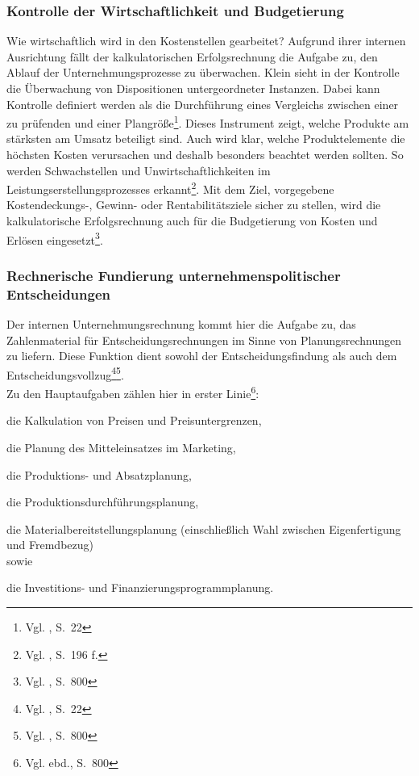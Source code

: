 \subsubsection{Kontrolle der Wirtschaftlichkeit und Budgetierung}
Wie wirtschaftlich wird in den Kostenstellen gearbeitet?
Aufgrund ihrer internen Ausrichtung fällt der kalkulatorischen Erfolgsrechnung die Aufgabe zu, den Ablauf der Unternehmungsprozesse zu überwachen. Klein sieht in der Kontrolle die Überwachung von Dispositionen untergeordneter Instanzen. Dabei kann Kontrolle definiert werden als die \glqq Durchführung eines Vergleichs zwischen einer zu prüfenden und einer Plangröße\grqq \footnote{Vgl. \cite{Klein1999}, S.~22}.
Dieses Instrument zeigt, welche Produkte am stärksten am Umsatz beteiligt sind. Auch wird klar, welche Produktelemente die höchsten Kosten verursachen und deshalb besonders beachtet werden sollten. So werden Schwachstellen und Unwirtschaftlichkeiten im Leistungserstellungsprozesses erkannt\footnote{Vgl. \cite{Woltje2008}, S.~196 f.}. Mit dem Ziel, vorgegebene Kostendeckungs-, Gewinn- oder Rentabilitätsziele sicher zu stellen, wird die kalkulatorische Erfolgsrechnung auch für die Budgetierung von Kosten und Erlösen eingesetzt\footnote{Vgl. \cite{Schierenbeck2008}, S.~800}.

\subsubsection{Rechnerische Fundierung unternehmenspolitischer Entscheidungen}
Der internen Unternehmungsrechnung kommt hier die Aufgabe zu, das Zahlenmaterial für Entscheidungsrechnungen im Sinne von Planungsrechnungen zu liefern. Diese Funktion dient sowohl der Entscheidungsfindung als auch dem Entscheidungsvollzug\footnote{Vgl. \cite{Klein1999}, S.~22}\footnote{Vgl. \cite{Schierenbeck2008}, S.~800}.\\
Zu den Hauptaufgaben zählen hier in erster Linie\footnote{Vgl. ebd., S.~800}: 
\begin{compactitem}
\item die Kalkulation von Preisen und Preisuntergrenzen, 
\item die Planung des Mitteleinsatzes im Marketing, 
\item die Produktions- und Absatzplanung, 
\item die Produktionsdurchführungsplanung, 
\item die Materialbereitstellungsplanung (einschließlich Wahl zwischen Eigenfertigung und Fremdbezug) \\sowie 
\item die Investitions- und Finanzierungsprogrammplanung. 
\end{compactitem} 





